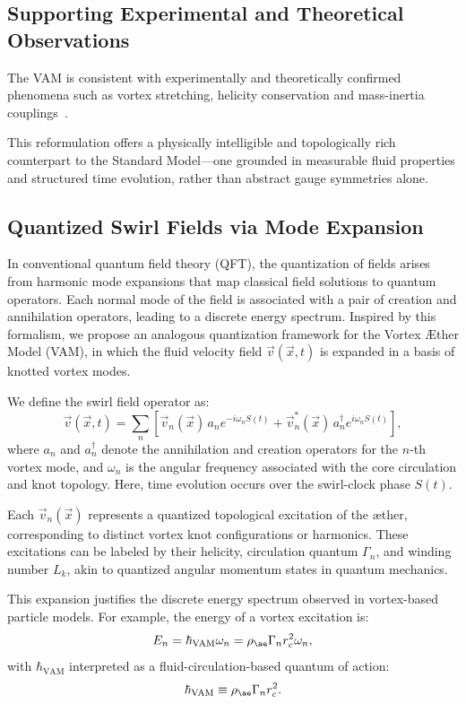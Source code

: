 \documentclass[12pt]{article}
\begin{document}
\subsection*{Supporting Experimental and Theoretical Observations}
The VAM is consistent with experimentally and theoretically confirmed phenomena such as vortex stretching, helicity conservation and mass-inertia couplings~\cite{batchelor1953, vinen2002, bewley2008, moffatt1969, kleckner2013, scheeler2014, bartlett1986}.

This reformulation offers a physically intelligible and topologically rich counterpart to the Standard Model---one grounded in measurable fluid properties and structured time evolution, rather than abstract gauge symmetries alone.

\subsection{Quantized Swirl Fields via Mode Expansion}

In conventional quantum field theory (QFT), the quantization of fields arises from harmonic mode expansions that map classical field solutions to quantum operators. Each normal mode of the field is associated with a pair of creation and annihilation operators, leading to a discrete energy spectrum. Inspired by this formalism, we propose an analogous quantization framework for the Vortex \AE{}ther Model (VAM), in which the fluid velocity field $\vec{v}(\vec{x}, t)$ is expanded in a basis of knotted vortex modes.

We define the swirl field operator as:
\begin{equation}
\vec{v}(\vec{x}, t) = \sum_n \left[ \vec{v}_n(\vec{x})\, a_n e^{-i\omega_n S(t)} + \vec{v}_n^*(\vec{x})\, a_n^\dagger e^{i\omega_n S(t)} \right],
\end{equation}
where $a_n$ and $a_n^\dagger$ denote the annihilation and creation operators for the $n$-th vortex mode, and $\omega_n$ is the angular frequency associated with the core circulation and knot topology. Here, time evolution occurs over the swirl-clock phase $S(t)$.

Each $\vec{v}_n(\vec{x})$ represents a quantized topological excitation of the \ae{}ther, corresponding to distinct vortex knot configurations or harmonics. These excitations can be labeled by their helicity, circulation quantum $\Gamma_n$, and winding number $L_k$, akin to quantized angular momentum states in quantum mechanics.

This expansion justifies the discrete energy spectrum observed in vortex-based particle models. For example, the energy of a vortex excitation is:
\begin{equation}
E_n = \hbar_{\text{VAM}} \omega_n = \rho_{\ae} \Gamma_n r_c^2 \omega_n,
\end{equation}
with $\hbar_{\text{VAM}}$ interpreted as a fluid-circulation-based quantum of action:
\begin{equation}
\hbar_{\text{VAM}} \equiv \rho_{\ae} \Gamma_n r_c^2.
\end{equation}
\end{document}
